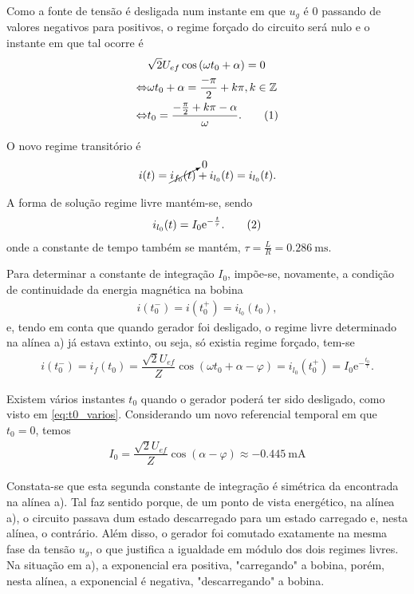 \documentclass[a4paper, titlepage, portuguese]{article}
\newcommand{\eq}{\Leftrightarrow} %
\newcommand\numberthis{\addtocounter{equation}{1}\tag{\theequation}}
\newcommand\e{\mathrm{e} }
\begin{document}
	\subsubsection{}
	\par
	Como a fonte de tensão é desligada num instante em que $u_g$ é 0 passando de valores negativos para positivos, o regime forçado do circuito será nulo e o instante em que tal ocorre é
	\begin{align*}
		&\sqrt{2}U_{ef} \cos\left(\omega t_0 + \alpha\right) = 0 \\ \eq
		&\omega t_0 + \alpha = \dfrac{-\pi}{2} + k\pi, k \in \mathbb{Z} \\ \eq
		&t_0 = \dfrac{- \frac{\pi}{2} + k\pi - \alpha}{\omega}. \numberthis \label{eq:t0_varios}
	\end{align*}
	\par
	O novo regime transitório é
	\begin{align*}
		i(t) = \cancelto{0}{i_{f_0}(t)} + i_{l_0}(t) = i_{l_0}(t).
	\end{align*}
	\par
	A forma de solução regime livre mantém-se, sendo
	\begin{align*}
		i_{l_0}(t) = I_0 \e^{-\frac{t}{\tau}}. \numberthis \label{eq:trans_RL_2livre}
	\end{align*}
	onde a constante de tempo também se mantém, $\tau = \frac{L}{R} = \SI{0.286}{\milli\second}$. \\
	\par
	Para determinar a constante de integração $I_0$, impõe-se, novamente, a condição de continuidade da energia magnética na bobina
	\begin{align*}
		i(t_0^-) = i(t_0^+) = i_{l_0}(t_0),
	\end{align*}
	e, tendo em conta que quando gerador foi desligado, o regime livre determinado na alínea a) já estava extinto, ou seja, só existia regime forçado, tem-se
	\begin{align*}
		i(t_0^-) = i_f(t_0) = \dfrac{\sqrt{2}U_{ef}}{Z} \cos\left(\omega t_0 + \alpha - \varphi\right) = i_{l_0}(t_0^+) = I_0 \e^{-\frac{t_0}{\tau}}.
	\end{align*}
	\par
	Existem vários instantes $t_0$ quando o gerador poderá ter sido desligado, como visto em \eqref{eq:t0_varios}. Considerando um novo referencial temporal em que $t_0 = 0$, temos
	\begin{align*}
		I_0 = \dfrac{\sqrt{2}U_{ef}}{Z} \cos\left(\alpha - \varphi\right) \approx \SI{-0.445}{\milli\ampere}
	\end{align*}
	\par
	Constata-se que esta segunda constante de integração é simétrica da encontrada na alínea a). Tal faz sentido porque, de um ponto de vista energético, na alínea a), o circuito passava dum estado descarregado para um estado carregado e, nesta alínea, o contrário. Além disso, o gerador foi comutado exatamente na mesma fase da tensão $u_g$, o que justifica a igualdade em módulo dos dois regimes livres. Na situação em a), a exponencial era positiva, "carregando" a bobina, porém, nesta alínea, a exponencial é negativa, "descarregando" a bobina.
\end{document}
